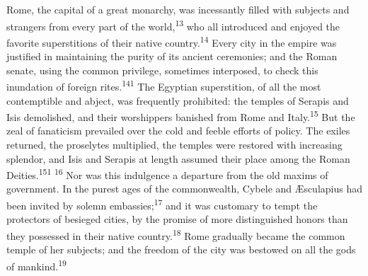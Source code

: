 
Rome, the capital of a great monarchy, was incessantly filled
with subjects and strangers from every part of the world,\textsuperscript{13} who
all introduced and enjoyed the favorite superstitions of their
native country.\textsuperscript{14} Every city in the empire was justified in
maintaining the purity of its ancient ceremonies; and the Roman
senate, using the common privilege, sometimes interposed, to
check this inundation of foreign rites.\textsuperscript{141} The Egyptian
superstition, of all the most contemptible and abject, was
frequently prohibited: the temples of Serapis and Isis
demolished, and their worshippers banished from Rome and Italy.\textsuperscript{15}
But the zeal of fanaticism prevailed over the cold and feeble
efforts of policy. The exiles returned, the proselytes
multiplied, the temples were restored with increasing splendor,
and Isis and Serapis at length assumed their place among the
Roman Deities.\textsuperscript{151} \textsuperscript{16} Nor was this indulgence a departure from
the old maxims of government. In the purest ages of the
commonwealth, Cybele and Æsculapius had been invited by solemn
embassies;\textsuperscript{17} and it was customary to tempt the protectors of
besieged cities, by the promise of more distinguished honors than
they possessed in their native country.\textsuperscript{18} Rome gradually became
the common temple of her subjects; and the freedom of the city
was bestowed on all the gods of mankind.\textsuperscript{19}




